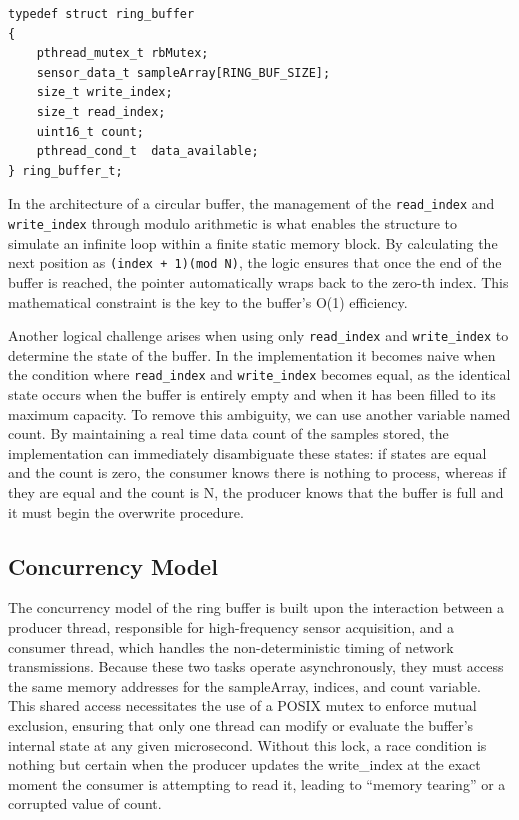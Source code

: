 \begin{verbatim}
typedef struct ring_buffer
{
    pthread_mutex_t rbMutex;
    sensor_data_t sampleArray[RING_BUF_SIZE];
    size_t write_index;
    size_t read_index;
    uint16_t count;
    pthread_cond_t  data_available;
} ring_buffer_t;
\end{verbatim}
In the architecture of a circular buffer, the management of the \texttt{read\_index} and \texttt{write\_index} through modulo arithmetic is what enables the structure to simulate an infinite loop within a finite static memory block. By calculating the next position as \texttt{(index + 1)(mod N)}, the logic ensures that once the end of the buffer is reached, the pointer automatically wraps back to the zero-th index. This mathematical constraint is the key to the buffer’s O(1) efficiency.

Another logical challenge arises when using only \texttt{read\_index} and \texttt{write\_index} to determine the state of the buffer. In the implementation it becomes naive when the condition where \texttt{read\_index} and \texttt{write\_index} becomes equal, as the identical state occurs when the buffer is entirely empty and when it has been filled to its maximum capacity. To remove this ambiguity, we can use another variable named count. By maintaining a real time data count of the samples stored, the implementation can immediately disambiguate these states: if states are equal and the count is zero, the consumer knows there is nothing to process, whereas if they are equal and the count is N, the producer knows that the buffer is full and it must begin the overwrite procedure.

\subsection{Concurrency Model}
The concurrency model of the ring buffer is built upon the interaction between a producer thread, responsible for high-frequency sensor acquisition, and a consumer thread, which handles the non-deterministic timing of network transmissions. Because these two tasks operate asynchronously, they must access the same memory addresses for the sampleArray, indices, and count variable. This shared access necessitates the use of a POSIX mutex to enforce mutual exclusion, ensuring that only one thread can modify or evaluate the buffer’s internal state at any given microsecond. Without this lock, a race condition is nothing but certain when the producer updates the write\_index at the exact moment the consumer is attempting to read it, leading to “memory tearing” or a corrupted value of count.

